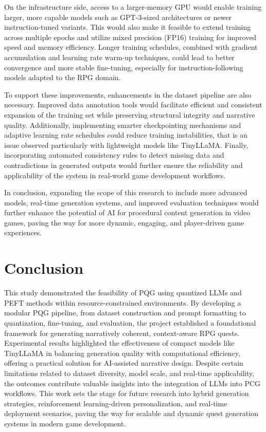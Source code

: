 On the infrastructure side, access to a larger-memory GPU would enable training
larger, more capable models such as GPT-3-sized architectures or newer instruction-tuned
variants. This would also make it feasible to extend training across multiple epochs
and utilize mixed precision (FP16) training for improved speed and memory efficiency.
Longer training schedules, combined with gradient accumulation and learning rate warm-up
techniques, could lead to better convergence and more stable fine-tuning, especially
for instruction-following models adapted to the RPG domain.

To support these improvements, enhancements in the dataset pipeline are also necessary.
Improved data annotation tools would facilitate efficient and consistent expansion of 
the training set while preserving structural integrity and narrative quality. Additionally,
implementing smarter checkpointing mechanisms and adaptive learning rate schedules
could reduce training instabilities, that is an issue observed particularly with lightweight
models like TinyLLaMA. Finally, incorporating automated consistency rules to detect
missing data and contradictions in generated outputs would further ensure the reliability
and applicability of the system in real-world game development workflows.

In conclusion, expanding the scope of this research to include more advanced models,
real-time generation systems, and improved evaluation techniques would further enhance
the potential of AI for procedural content generation in video games, paving the way for
more dynamic, engaging, and player-driven game experiences.

\section{Conclusion}

This study demonstrated the feasibility of PQG using quantized LLMs and PEFT methods
within resource-constrained environments. By developing a modular PQG pipeline,
from dataset construction and prompt formatting to quantization, fine-tuning, and evaluation,
the project established a foundational framework for generating narratively
coherent, context-aware RPG quests. Experimental results highlighted the effectiveness
of compact models like TinyLLaMA in balancing generation quality with computational
efficiency, offering a practical solution for AI-assisted narrative design. Despite certain limitations
related to dataset diversity, model scale, and real-time applicability, the outcomes contribute
valuable insights into the integration of LLMs into PCG workflows. This work
sets the stage for future research into hybrid generation strategies, reinforcement learning-driven
personalization, and real-time deployment scenarios, paving the way for scalable
and dynamic quest generation systems in modern game development.

\newpage
